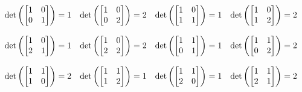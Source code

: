 \begin{mdframed}[style=darkAnswer,frametitle={Joe Starr}]
$$\begin{matrix}
\text{det}\lrp{\begin{bmatrix} 1 & 0 \\ 0 & 1 \end{bmatrix}}= 1 &
\text{det}\lrp{\begin{bmatrix} 1 & 0 \\ 0 & 2 \end{bmatrix}}= 2 &
\text{det}\lrp{\begin{bmatrix} 1 & 0 \\ 1 & 1 \end{bmatrix}}= 1 &
\text{det}\lrp{\begin{bmatrix} 1 & 0 \\ 1 & 2 \end{bmatrix}}= 2 \\ \hspace{.5in} \\
\text{det}\lrp{\begin{bmatrix} 1 & 0 \\ 2 & 1 \end{bmatrix}}= 1 &
\text{det}\lrp{\begin{bmatrix} 1 & 0 \\ 2 & 2 \end{bmatrix}}= 2 &
\text{det}\lrp{\begin{bmatrix} 1 & 1 \\ 0 & 1 \end{bmatrix}}= 1 &
\text{det}\lrp{\begin{bmatrix} 1 & 1 \\ 0 & 2 \end{bmatrix}}= 2 \\ \hspace{.5in} \\
\text{det}\lrp{\begin{bmatrix} 1 & 1 \\ 1 & 0 \end{bmatrix}}= 2 &
\text{det}\lrp{\begin{bmatrix} 1 & 1 \\ 1 & 2 \end{bmatrix}}= 1 &
\text{det}\lrp{\begin{bmatrix} 1 & 1 \\ 2 & 0 \end{bmatrix}}= 1 &
\text{det}\lrp{\begin{bmatrix} 1 & 1 \\ 2 & 1 \end{bmatrix}}= 2 \\ \hspace{.5in} \\

\end{matrix}$$
\end{mdframed}

